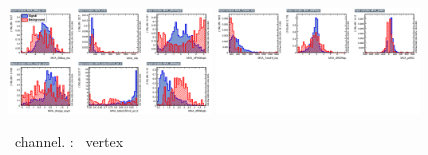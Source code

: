 \begin{figure}[htbp]
	\includegraphics[width=0.48\textwidth]{6_Search/Figures/MVAtechnics/singletopzut/eee/variables_id_c1.png}
	\includegraphics[width=0.48\textwidth]{6_Search/Figures/MVAtechnics/singletopzut/eee/variables_id_c2.png}
	\caption{\eee\ channel. \STSR: \Zut\ vertex }
	\label{image:Figureseeesingletopzut}
\end{figure}

